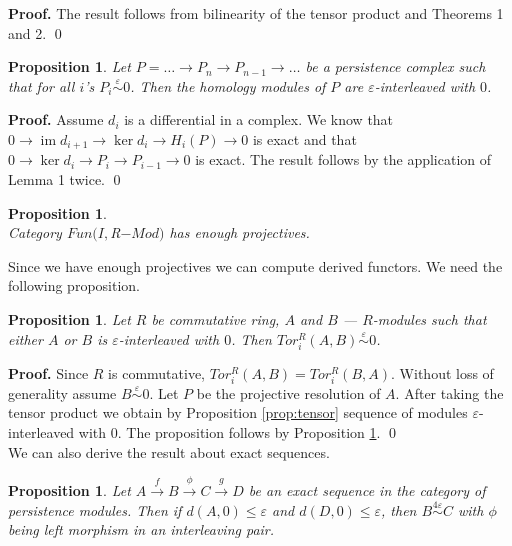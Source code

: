 \documentclass[a4paper, 12pt]{article}
\newcounter{stmcounter}[section]
\numberwithin{equation}{section}
\newtheorem{proposition}[stmcounter]{Proposition}
\theoremstyle{definition}
\theoremstyle{remark}
\newenvironment{pf}{\noindent\textbf{Proof.}}{\qed}
\renewcommand{\leq}{\leqslant}
\begin{document}
\begin{pf}
  The result follows from bilinearity of the tensor product and Theorems 1 and 2.
\end{pf}

\begin{proposition}
  \label{prop:hominter}
  Let $P = \ldots \to P_n \to P_{n-1} \to \ldots$ be a persistence complex such that for all $i$'s $P_i \stackrel{\varepsilon}{\sim} 0$. Then the homology modules of $P$ are $\varepsilon$-interleaved with $0$.
\end{proposition}

\begin{pf}
  Assume $d_i$ is a differential in a complex. We know that $0 \to \operatorname{im}{d_{i+1}} \to \ker{d_{i}} \to H_i(P) \to 0$ is exact and that $0 \to \ker{d_i} \to P_i \to P_{i-1} \to 0$ is exact. The result follows by the application of Lemma 1 twice.
\end{pf}\\

\begin{proposition} {\cite[Page 2]{Mitchell81}}\\
  Category $Fun(I, $R$-Mod)$ has enough projectives.
\end{proposition}

Since we have enough projectives we can compute derived functors. We need the following proposition.\\

\begin{proposition}
  \label{prop:tor}
  Let $R$ be commutative ring, $A$ and $B$ --- $R$-modules such that either $A$ or $B$ is $\varepsilon$-interleaved with $0$. Then $Tor_i^R(A,B) \stackrel{\varepsilon}{\sim} 0$.
\end{proposition}

\begin{pf}
  Since $R$ is commutative, $Tor_i^R(A,B) = Tor_i^R(B,A)$. Without loss of generality assume $B \stackrel{\varepsilon}{\sim} 0$. Let $P$ be the projective resolution of $A$. After taking the tensor product we obtain by Proposition \ref{prop:tensor} sequence of modules $\varepsilon$-interleaved with $0$. The proposition follows by Proposition \ref{prop:hominter}.
\end{pf}\\

We can also derive the result about exact sequences.\\

\begin{proposition}
  \label{major}
  Let $A \xrightarrow{f} B \xrightarrow{\phi} C \xrightarrow{g} D$ be an exact sequence in the category of persistence modules. Then if $d(A,0) \leq \varepsilon$ and $d(D,0) \leq \varepsilon$, then $B \stackrel{4\varepsilon}{\sim} C$ with $\phi$ being left morphism in an interleaving pair.
\end{proposition}
\end{document}
